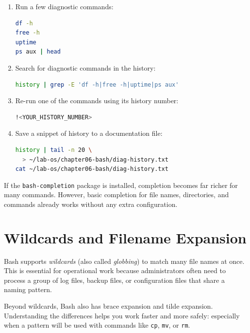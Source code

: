 \begin{enumerate}
  \item Run a few diagnostic commands:
\begin{lstlisting}[language=bash, caption={Running diagnostic commands}]
df -h
free -h
uptime
ps aux | head
\end{lstlisting}

  \item Search for diagnostic commands in the history:
\begin{lstlisting}[language=bash, caption={Searching commands from history}]
history | grep -E 'df -h|free -h|uptime|ps aux'
\end{lstlisting}

  \item Re-run one of the commands using its history number:
\begin{lstlisting}[language=bash, caption={Re-running a command from history}]
!<YOUR_HISTORY_NUMBER>
\end{lstlisting}

  \item Save a snippet of history to a documentation file:
\begin{lstlisting}[language=bash, caption={Saving history to a file}]
history | tail -n 20 \
  > ~/lab-os/chapter06-bash/diag-history.txt
cat ~/lab-os/chapter06-bash/diag-history.txt
\end{lstlisting}
\end{enumerate}

\begin{tipbox}
If the \texttt{bash-completion} package is installed, completion becomes far
richer for many commands. However, basic completion for file names,
directories, and commands already works without any extra configuration.
\end{tipbox}

\section{Wildcards and Filename Expansion}
\label{sec:wildcards-expansion}

Bash supports \textit{wildcards} (also called \textit{globbing}) to match
many file names at once. This is essential for operational work because
administrators often need to process a group of log files, backup files, or
configuration files that share a naming pattern.

Beyond wildcards, Bash also has brace expansion and tilde expansion.
Understanding the differences helps you work faster and more safely:
especially when a pattern will be used with commands like \texttt{cp},
\texttt{mv}, or \texttt{rm}.

